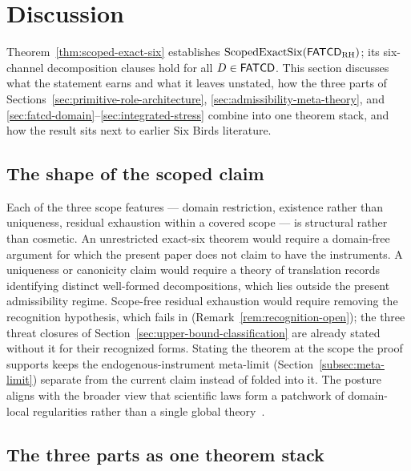\section{Discussion}\label{sec:discussion}


Theorem~\ref{thm:scoped-exact-six} establishes
\(\operatorname{ScopedExactSix}\!\left(\mathsf{FATCD}_{\mathrm{RH}}\right)\); its six-channel decomposition
clauses hold for all \(D\in\mathsf{FATCD}{}\).
This section discusses what the statement earns and what it leaves
unstated, how the three parts of
Sections~\ref{sec:primitive-role-architecture},
\ref{sec:admissibility-meta-theory}, and
\ref{sec:fatcd-domain}--\ref{sec:integrated-stress} combine into one
theorem stack, and how the result sits next to earlier Six Birds
literature.

\subsection{The shape of the scoped claim}\label{subsec:discussion-shape}

Each of the three scope features --- domain restriction, existence
rather than uniqueness, residual exhaustion within a covered scope
--- is structural rather than cosmetic. An unrestricted exact-six
theorem would require a domain-free argument for which the present
paper does not claim to have the instruments. A uniqueness or
canonicity claim would require a theory of translation records
identifying distinct well-formed decompositions, which lies outside
the present admissibility regime. Scope-free residual exhaustion
would require removing the recognition hypothesis, which fails in
\FATCD{} (Remark~\ref{rem:recognition-open}); the three threat closures of
Section~\ref{sec:upper-bound-classification} are already stated without it
for their recognized forms. Stating
the theorem at the scope the proof supports keeps the
endogenous-instrument meta-limit (Section~\ref{subsec:meta-limit})
separate from the current claim instead of folded into it. The posture
aligns with the broader view that scientific laws form a patchwork of
domain-local regularities rather than a single global
theory~\citep{Cartwright1999}.

\subsection{The three parts as one theorem stack}\label{subsec:discussion-pillars}

